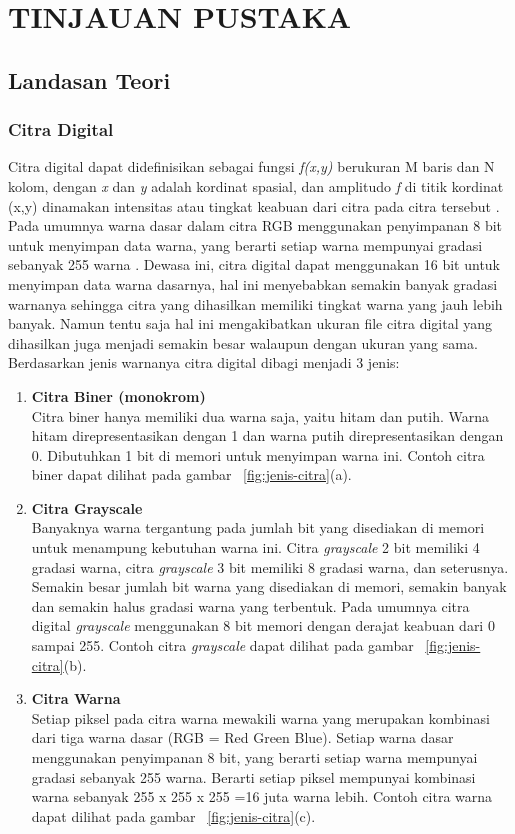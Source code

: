 
\chapter{TINJAUAN PUSTAKA}


\section{Landasan Teori}

\subsection{Citra Digital}
Citra digital dapat didefinisikan sebagai fungsi \textit{f(x,y)} berukuran M baris dan N kolom, dengan \textit{x} dan \textit{y} adalah kordinat spasial, dan amplitudo \textit{f} di titik kordinat (x,y) dinamakan intensitas atau tingkat keabuan dari citra pada citra tersebut . Pada umumnya warna dasar dalam citra RGB menggunakan penyimpanan 8 bit untuk menyimpan data warna, yang berarti setiap warna mempunyai gradasi sebanyak 255 warna . Dewasa ini, citra digital dapat menggunakan 16 bit untuk menyimpan data warna dasarnya, hal ini menyebabkan semakin banyak gradasi warnanya sehingga citra yang dihasilkan memiliki tingkat warna yang jauh lebih banyak. Namun tentu saja hal ini mengakibatkan ukuran file citra digital yang dihasilkan juga menjadi semakin besar walaupun dengan ukuran yang sama. Berdasarkan jenis warnanya citra digital dibagi menjadi 3 jenis:

\begin{enumerate} [label=\textbf{\alph*.}]
    \item \textbf{Citra Biner (monokrom)} \\ 
    Citra biner hanya memiliki dua warna saja, yaitu hitam dan putih. Warna hitam direpresentasikan dengan 1 dan warna putih direpresentasikan dengan 0. Dibutuhkan 1 bit di memori untuk menyimpan warna ini. Contoh citra biner dapat dilihat pada gambar ~\ref{fig:jenis-citra}(a).
    \item \textbf{Citra Grayscale} \\ 
    Banyaknya warna tergantung pada jumlah bit yang disediakan di memori untuk menampung kebutuhan warna ini. Citra \textit{grayscale} 2 bit memiliki 4 gradasi warna, citra \textit{grayscale} 3 bit memiliki 8 gradasi warna, dan seterusnya. Semakin besar jumlah bit warna yang disediakan di memori, semakin banyak dan semakin halus gradasi warna yang terbentuk. Pada umumnya citra digital \textit{grayscale} menggunakan 8 bit memori dengan derajat keabuan dari 0 sampai 255. Contoh citra \textit{grayscale} dapat dilihat pada gambar ~\ref{fig:jenis-citra}(b).
    \item \textbf{Citra Warna} \\ 
    Setiap piksel pada citra warna mewakili warna yang merupakan kombinasi dari tiga warna dasar (RGB = Red Green Blue). Setiap warna dasar menggunakan penyimpanan 8 bit, yang berarti setiap warna mempunyai gradasi sebanyak 255 warna. Berarti setiap piksel mempunyai kombinasi warna sebanyak 255 x 255 x 255 =16 juta warna lebih. Contoh citra warna dapat dilihat pada gambar ~\ref{fig:jenis-citra}(c).
\end{enumerate}

